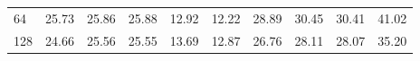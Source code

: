 \begin{tabular}{lrrrrrrrrr}
64 & {\cellcolor[HTML]{7FC97F}} \color[HTML]{000000} 25.73 & {\cellcolor[HTML]{7DC87E}} \color[HTML]{000000} 25.86 & {\cellcolor[HTML]{7DC87E}} \color[HTML]{000000} 25.88 & {\cellcolor[HTML]{F4FBF1}} \color[HTML]{000000} 12.92 & {\cellcolor[HTML]{F7FCF5}} \color[HTML]{000000} 12.22 & {\cellcolor[HTML]{53B466}} \color[HTML]{F1F1F1} 28.89 & {\cellcolor[HTML]{3FA85B}} \color[HTML]{F1F1F1} 30.45 & {\cellcolor[HTML]{3FA95C}} \color[HTML]{F1F1F1} 30.41 & {\cellcolor[HTML]{00441B}} \color[HTML]{F1F1F1} 41.02 \\
128 & {\cellcolor[HTML]{68BE70}} \color[HTML]{000000} 24.66 & {\cellcolor[HTML]{58B668}} \color[HTML]{F1F1F1} 25.56 & {\cellcolor[HTML]{58B668}} \color[HTML]{F1F1F1} 25.55 & {\cellcolor[HTML]{F2FAEF}} \color[HTML]{000000} 13.69 & {\cellcolor[HTML]{F7FCF5}} \color[HTML]{000000} 12.87 & {\cellcolor[HTML]{42AB5D}} \color[HTML]{F1F1F1} 26.76 & {\cellcolor[HTML]{339C52}} \color[HTML]{F1F1F1} 28.11 & {\cellcolor[HTML]{339C52}} \color[HTML]{F1F1F1} 28.07 & {\cellcolor[HTML]{00441B}} \color[HTML]{F1F1F1} 35.20 \\
\end{tabular}
